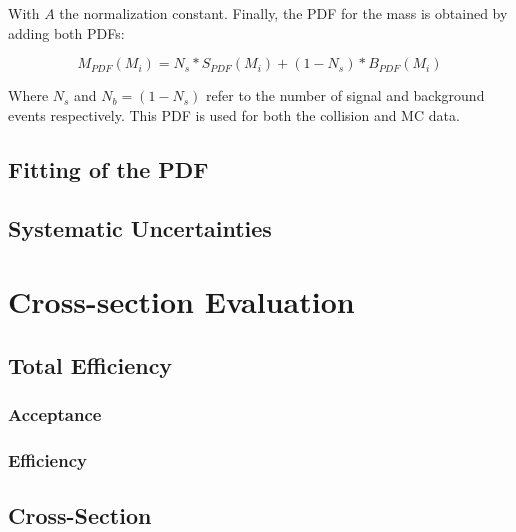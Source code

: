 With $A$ the normalization constant. Finally, the PDF for the mass is obtained by adding both PDFs:

\begin{equation}
M_{PDF}(M_i) = N_s*S_{PDF}(M_i)  + (1-N_s)*B_{PDF}(M_i)
\end{equation}

Where $N_s$ and $N_b = (1-N_s)$ refer to the number of signal and background events respectively. This PDF is used for both the collision and MC data.

\subsection{Fitting of the PDF}
\subsection{Systematic Uncertainties}

\section{Cross-section Evaluation}
\subsection{Total Efficiency}
\subsubsection{Acceptance}

\subsubsection{Efficiency}
\subsection{Cross-Section}
\lipsum[4]